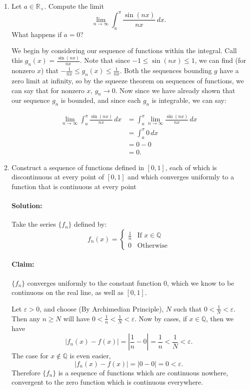 \documentclass{article}
\begin{document}
\begin{enumerate}
\item Let $a\in \mathbb{R}_{+}$. Compute the limit
  \[
  \lim_{n \to \infty} \int_{a}^{\pi} \frac{\sin(nx)}{nx} \, d x 
  .\] 
  What happens if $a=0$?

  We begin by considering our sequence of functions within the integral. Call this
  $g_n(x) =\frac{\sin(nx)}{nx}$. Note that since $-1\leq\sin(nx)\leq 1$, we can find (for nonzero $x$) that $-\frac{1}{nx}\leq g_n(x)\leq \frac{1}{nx}$. Both the sequences bounding $g$ have a zero limit at infinity, so by the squeeze theorem on sequences of functions, we can say that for nonzero $x$, $g_n\to 0$.
  Now since we have already shown that our sequence $g_n$ is bounded, and since each $g_n$ is integrable, we can say:

  \begin{align*}
  \lim_{n \to \infty} \int_{a}^{\pi} \frac{\sin(nx)}{nx} \, d x 
  &=\int_{a}^{\pi} \lim_{n \to \infty} \frac{\sin(nx)}{nx} \, d x \\
  &=\int_{a}^{\pi} 0 \, d x \\
  &= 0-0 \\
  &= 0
  .\end{align*}

\item Construct a sequence of functions defined in $[0,1]$, each of which is discontinuous at every point of $[0,1]$ and which converges uniformly to a function that is continuous at every point 

  \paragraph{Solution: }Take the series $\{f_n\} $ defined by:
  \[
    f_n(x)=\begin{cases}
      \frac{1}{n}&\text{If } x\in \mathbb{Q}\\
      0&\text{Otherwise}
    \end{cases}
  \] 
  \paragraph{Claim:}  $\{f_n\} $ converges uniformly to the constant function $0$, which we know to be continuous on the real line, as well as $[0,1]$. 

  Let $\varepsilon>0$, and choose (By Archimedian Principle), $N$ such that $0<\frac{1}{N}<\varepsilon$.
  Then any $n\geq N$ will have $0<\frac{1}{n}<\frac{1}{N}<\varepsilon$. Now by cases, if $x\in \mathbb{Q}$, then we have 
  \[
  |f_n(x)-f(x)|=\left|\frac{1}{n}-0\right|=\frac{1}{n}<\frac{1}{N}<\varepsilon
  .\] 
  The case for $x\not\in \mathbb{Q}$ is even easier, 
\[
  |f_n(x)-f(x)|=\left|0-0\right|=0<\varepsilon
.\] 
  Therefore $\{f_n\} $ is a sequence of functions which are continuous nowhere, convergent to the zero function which is continuous everywhere. 


\end{enumerate}
\end{document}
